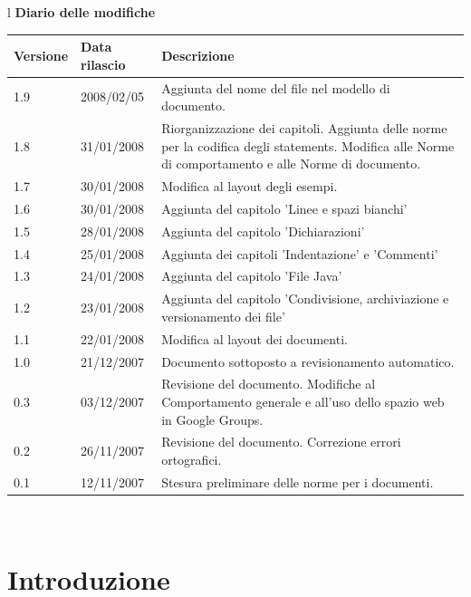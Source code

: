 \documentclass[11pt,titlepage,a4paper]{report}
\begin{document}
\begin{center}
\begin{table}[hbtp]
\large{
\begin{tabular}{l}
\Large{\textbf{\textsf{Diario delle modifiche}}} \\
\begin{tabular}{||p{2cm}||p{3.5cm}||p{6cm}||} \hline
\textbf{Versione} & \textbf{Data rilascio} & \textbf{Descrizione} \\ \hline
1.9 & 2008/02/05 & Aggiunta del nome del file nel modello di documento.\\ \hline
1.8 & 31/01/2008 & Riorganizzazione dei capitoli. Aggiunta delle norme per la codifica degli statements. Modifica alle Norme di comportamento e alle Norme di documento. \\ \hline
1.7 & 30/01/2008 & Modifica al layout degli esempi.\\ \hline
1.6 & 30/01/2008 & Aggiunta del capitolo 'Linee e spazi bianchi'\\ \hline
1.5 & 28/01/2008 & Aggiunta del capitolo 'Dichiarazioni'\\ \hline
1.4 & 25/01/2008 & Aggiunta dei capitoli 'Indentazione' e 'Commenti'\\ \hline
1.3 & 24/01/2008 & Aggiunta del capitolo 'File Java'\\ \hline
1.2 & 23/01/2008 & Aggiunta del capitolo 'Condivisione, archiviazione e versionamento dei file'\\ \hline
1.1 & 22/01/2008 & Modifica al layout dei documenti.\\ \hline
1.0 & 21/12/2007 & Documento sottoposto a revisionamento automatico.\\ \hline
0.3 & 03/12/2007 & Revisione del documento. Modifiche al Comportamento generale e all'uso dello spazio web in Google Groups. \\ \hline
0.2 & 26/11/2007 & Revisione del documento. Correzione errori ortografici. \\ \hline
0.1 & 12/11/2007 & Stesura preliminare delle norme per i documenti. \\ \hline
\end{tabular} \\
\end{tabular}

}
\end{table}
\end{center}


\newpage
\tableofcontents 

\chapter{Introduzione}
\end{document}
